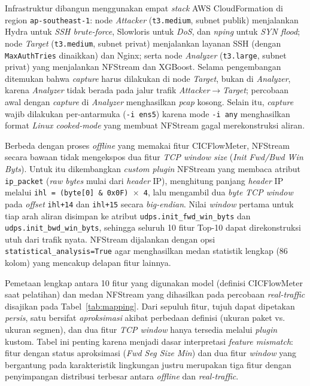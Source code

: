 \documentclass[10pt,twocolumn,a4paper]{extarticle}
\begin{document}
Infrastruktur dibangun menggunakan empat \textit{stack} AWS CloudFormation di region \texttt{ap-southeast-1}: node \textit{Attacker} (\texttt{t3.medium}, subnet publik) menjalankan Hydra untuk \textit{SSH brute-force}, Slowloris untuk \textit{DoS}, dan \textit{nping} untuk \textit{SYN flood}; node \textit{Target} (\texttt{t3.medium}, subnet privat) menjalankan layanan SSH (dengan \texttt{MaxAuthTries} dinaikkan) dan Nginx; serta node \textit{Analyzer} (\texttt{t3.large}, subnet privat) yang menjalankan NFStream dan XGBoost. Selama pengembangan ditemukan bahwa \textit{capture} harus dilakukan di node \textit{Target}, bukan di \textit{Analyzer}, karena \textit{Analyzer} tidak berada pada jalur trafik \textit{Attacker}$\rightarrow$\textit{Target}; percobaan awal dengan \textit{capture} di \textit{Analyzer} menghasilkan \textit{pcap} kosong. Selain itu, \textit{capture} wajib dilakukan per-antarmuka (\texttt{-i ens5}) karena mode \texttt{-i any} menghasilkan format \textit{Linux cooked-mode} yang membuat NFStream gagal merekonstruksi aliran.

Berbeda dengan proses \textit{offline} yang memakai fitur CICFlowMeter, NFStream secara bawaan tidak mengekspos dua fitur \textit{TCP window size} (\textit{Init Fwd/Bwd Win Byts}). Untuk itu dikembangkan \textit{custom plugin} NFStream yang membaca atribut \texttt{ip\_packet} (\textit{raw bytes} mulai dari \textit{header} IP), menghitung panjang \textit{header} IP melalui \texttt{ihl = (byte[0] \& 0x0F) $\times$ 4}, lalu mengambil dua \textit{byte} \textit{TCP window} pada \textit{offset} \texttt{ihl+14} dan \texttt{ihl+15} secara \textit{big-endian}. Nilai \textit{window} pertama untuk tiap arah aliran disimpan ke atribut \texttt{udps.init\_fwd\_win\_byts} dan \texttt{udps.init\_bwd\_win\_byts}, sehingga seluruh 10 fitur Top-10 dapat direkonstruksi utuh dari trafik nyata. NFStream dijalankan dengan opsi \texttt{statistical\_analysis=True} agar menghasilkan medan statistik lengkap (86 kolom) yang mencakup delapan fitur lainnya.

Pemetaan lengkap antara 10 fitur yang digunakan model (definisi CICFlowMeter saat pelatihan) dan medan NFStream yang dihasilkan pada percobaan \textit{real-traffic} disajikan pada Tabel~\ref{tab:mapping}. Dari sepuluh fitur, tujuh dapat dipetakan \textit{persis}, satu bersifat \textit{aproksimasi} akibat perbedaan definisi (ukuran paket vs. ukuran segmen), dan dua fitur \textit{TCP window} hanya tersedia melalui \textit{plugin} kustom. Tabel ini penting karena menjadi dasar interpretasi \textit{feature mismatch}: fitur dengan status aproksimasi (\textit{Fwd Seg Size Min}) dan dua fitur \textit{window} yang bergantung pada karakteristik lingkungan justru merupakan tiga fitur dengan penyimpangan distribusi terbesar antara \textit{offline} dan \textit{real-traffic}.
\end{document}
